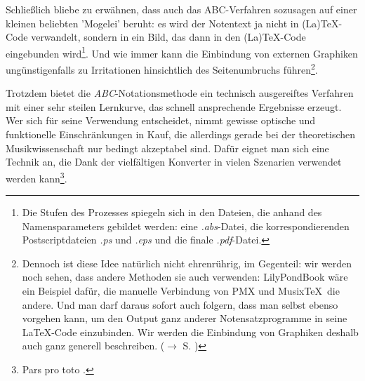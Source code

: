 Schließlich bliebe zu erwähnen, dass auch das ABC-Verfahren sozusagen auf einer
kleinen beliebten 'Mogelei' beruht: es wird der Notentext ja nicht in
(La)\TeX-Code verwandelt, sondern in ein Bild, das dann in den (La)\TeX-Code
eingebunden wird\footnote{Die Stufen des Prozesses spiegeln sich in den Dateien,
die anhand des Namensparameters gebildet werden: eine \textit{.abs}-Datei, die
korrespondierenden Postscriptdateien \textit{.ps} und \textit{.eps} und die
finale \textit{.pdf}-Datei.}. Und wie immer kann die Einbindung von externen
Graphiken ungünstigenfalls zu Irritationen hinsichtlich des Seitenumbruchs
führen\footnote{Dennoch ist diese Idee natürlich nicht ehrenrührig, im
Gegenteil: wir werden noch sehen, dass andere Methoden sie auch verwenden:
LilyPondBook wäre ein Beispiel dafür, die manuelle Verbindung von PMX und
Musix\TeX\ die andere. Und man darf daraus sofort auch folgern, dass man selbst
ebenso vorgehen kann, um den Output ganz anderer Notensatzprogramme in seine
\LaTeX-Code einzubinden. Wir werden die Einbindung von Graphiken deshalb auch
ganz generell beschreiben.
($\rightarrow$ S. \pageref{IncludeGraphics})}.\label{AbcGraphics}

Trotzdem bietet die \textit{ABC}-Notationsmethode ein technisch ausgereiftes
Verfahren mit einer sehr steilen Lernkurve, das schnell ansprechende Ergebnisse
erzeugt. Wer sich für seine Verwendung entscheidet, nimmt gewisse optische und
funktionelle Einschränkungen in Kauf, die allerdings gerade bei der
theoretischen Musikwissenschaft nur bedingt akzeptabel sind.
Dafür eignet man sich eine Technik an, die Dank der vielfältigen Konverter in
vielen Szenarien verwendet werden kann\footnote{Pars pro toto
\cite[vgl.][\nopage wp]{Rosen2018a}.}.
% 
